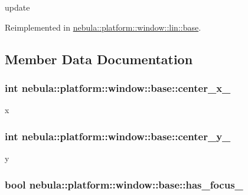 update 

Reimplemented in \hyperlink{classnebula_1_1platform_1_1window_1_1lin_1_1base_ab3a910d3a1f8b6d37d57461e02071f3f}{nebula::platform::window::lin::base}.

\subsection{Member Data Documentation}
\hypertarget{classnebula_1_1platform_1_1window_1_1base_ac59776f251a4f2f39928d12dae0f1f13}{
\subsubsection[{center\_\-x\_\-}]{\setlength{\rightskip}{0pt plus 5cm}int {\bf nebula::platform::window::base::center\_\-x\_\-}}}
\label{classnebula_1_1platform_1_1window_1_1base_ac59776f251a4f2f39928d12dae0f1f13}


x \hypertarget{classnebula_1_1platform_1_1window_1_1base_aa28a2fe0192a3d4898df894a32e39ead}{
\subsubsection[{center\_\-y\_\-}]{\setlength{\rightskip}{0pt plus 5cm}int {\bf nebula::platform::window::base::center\_\-y\_\-}}}
\label{classnebula_1_1platform_1_1window_1_1base_aa28a2fe0192a3d4898df894a32e39ead}


y \hypertarget{classnebula_1_1platform_1_1window_1_1base_a02f6df954bf4e850c611a3296301f087}{
\subsubsection[{has\_\-focus\_\-}]{\setlength{\rightskip}{0pt plus 5cm}bool {\bf nebula::platform::window::base::has\_\-focus\_\-}}}
\label{classnebula_1_1platform_1_1window_1_1base_a02f6df954bf4e850c611a3296301f087}


